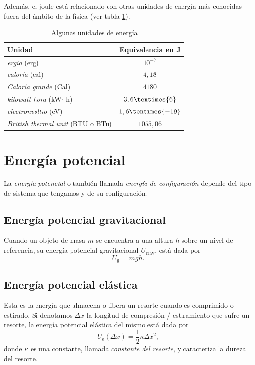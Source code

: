 Además, el joule está relacionado con otras unidades de energía más conocidas fuera del ámbito de la física (ver tabla \ref{tab:cal}).
\begin{table}[h!]
\caption{Algunas unidades de energ\'ia}
\label{tab:cal}
\centering
\begin{tabular}{lc}
\toprule
\textbf{Unidad}&\textbf{Equivalencia en J} \\[.35cm]
\toprule
\textit{ergio} (erg)& $10^{-7}$\\[.35cm]
\textit{calor\'ia} (cal)& $4,18$ \\[.35cm]
\textit{Calor\'ia grande} (Cal) & $4180$ \\[.35cm]
\textit{kilowatt-hora} (kW$\cdot$ h)& $3,6\tentimes{6}$ \\[.35cm]
\textit{electronvoltio} (eV)& $1,6\tentimes{-19}$ \\[.35cm]
\textit{British thermal unit} (BTU o BTu)& $1055,06$ \\[.35cm]
\toprule
\end{tabular}
\end{table}

\section{Energ\'ia potencial}

La \textit{energ\'ia potencial} o tambi\'en llamada \textit{energ\'ia de configuraci\'on} depende del tipo de sistema que tengamos y de su configuraci\'on.\\[.35cm]

\subsection{Energ\'ia potencial gravitacional}
Cuando un objeto de masa $m$ se encuentra a una altura $h$ sobre un nivel de referencia, su energ\'ia potencial gravitacional $U_{\text{grav}}$, est\'a dada por
\begin{equation}
U_\text{g}=mgh.
\end{equation}


\subsection{Energ\'ia potencial el\'astica} 
Esta es la energ\'ia que almacena o libera un resorte cuando es comprimido o estirado. Si denotamos $\Delta x$ la longitud de compresi\'on / estiramiento que sufre un resorte, la energ\'ia potencial el\'astica del mismo est\'a dada por
\begin{equation}
U_{\text{e}}(\Delta x)=\frac{1}{2}\kappa\Delta x^{2},
\end{equation}
donde $\kappa$ es una constante, llamada \textit{constante del resorte}, y caracteriza la dureza del resorte.

